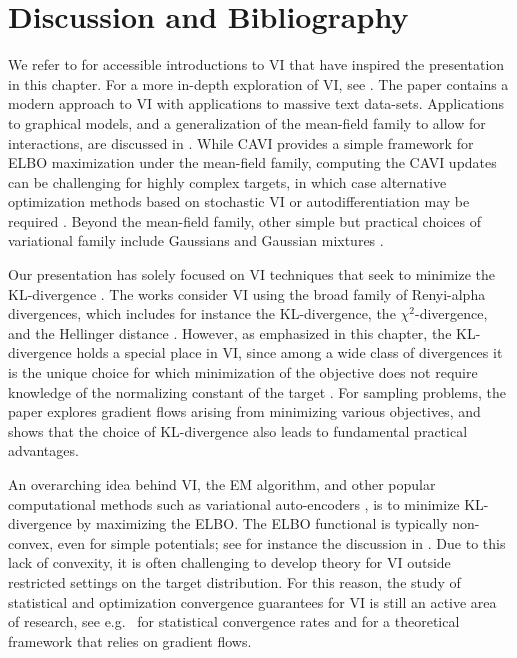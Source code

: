 
\section{Discussion and Bibliography}
\label{sec:10.3}

We refer to \cite{28,29} for accessible introductions to VI that have inspired the presentation in
this chapter. For a more in-depth exploration of VI, see \cite{119,233}. The paper \cite{112}
contains a modern approach to VI with applications to massive text data-sets. Applications to
graphical models, and a generalization of the mean-field family to allow for interactions, are
discussed in \cite{119}. While CAVI provides a simple framework for ELBO maximization under the
mean-field family, computing the CAVI updates can be challenging for highly complex targets, in
which case alternative optimization methods based on stochastic VI or autodifferentiation may be
required \cite{112,131}. Beyond the mean-field family, other simple but practical choices of
variational family include Gaussians \cite{208} and Gaussian mixtures \cite{133}.

Our presentation has solely focused on VI techniques that seek to minimize the KL-divergence
\cite{132}. The works \cite{141,110} consider VI using the broad family of Renyi-alpha divergences,
which includes for instance the KL-divergence, the $\chi^2$-divergence, and the Hellinger distance
\cite{86}. However, as emphasized in this chapter, the KL-divergence holds a special place in VI,
since among a wide class of divergences it is the unique choice for which minimization of the
objective does not require knowledge of the normalizing constant of the target \cite{47}. For
sampling problems, the paper \cite{79} explores gradient flows arising from minimizing various
objectives, and shows that the choice of KL-divergence also leads to fundamental practical
advantages.

An overarching idea behind VI, the EM algorithm, and other popular computational methods such as
variational auto-encoders \cite{123}, is to minimize KL-divergence by maximizing the ELBO\@. The
ELBO functional is typically non-convex, even for simple potentials; see for instance the discussion
in \cite{4}. Due to this lack of convexity, it is often challenging to develop theory for VI outside
restricted settings on the target distribution. For this reason, the study of statistical and
optimization convergence guarantees for VI is still an active area of research, see e.g.\ \cite{242}
for statistical convergence rates and \cite{133} for a theoretical framework that relies on gradient
flows.

